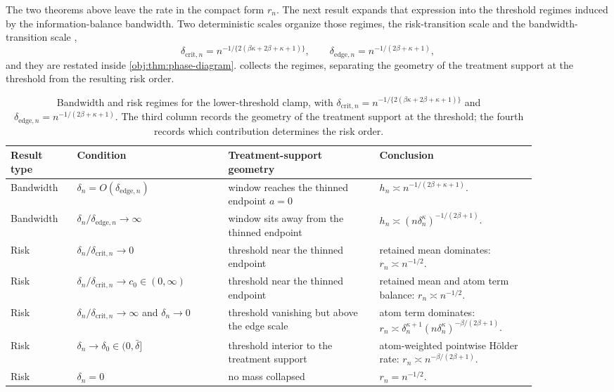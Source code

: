 The two theorems above leave the rate in the compact form \(r_n\). The next result expands that expression into the threshold regimes induced by the information-balance bandwidth. Two deterministic scales organize those regimes, the risk-transition scale  and the bandwidth-transition scale ,
\[
\delta_{\mathrm{crit},n}
=
n^{-1/\{2(\beta\kappa+2\beta+\kappa+1)\}},
\qquad
\delta_{\mathrm{edge},n}
=
n^{-1/(2\beta+\kappa+1)} ,
\]
and they are restated inside \cref{obj:thm:phase-diagram}.  collects the regimes, separating the geometry of the treatment support at the threshold from the resulting risk order.

\begin{table}[t]
\centering
\begin{tabular}{p{0.11\linewidth}p{0.25\linewidth}p{0.25\linewidth}p{0.26\linewidth}}
\hline
Result type & Condition & Treatment-support geometry & Conclusion \\
\hline
Bandwidth & \(\delta_n=O(\delta_{\mathrm{edge},n})\) & window reaches the thinned endpoint \(a=0\) & \(h_n\asymp n^{-1/(2\beta+\kappa+1)}\). \\
Bandwidth & \(\delta_n/\delta_{\mathrm{edge},n}\to\infty\) & window sits away from the thinned endpoint & \(h_n\asymp (n\delta_n^\kappa)^{-1/(2\beta+1)}\). \\
Risk & \(\delta_n/\delta_{\mathrm{crit},n}\to0\) & threshold near the thinned endpoint & retained mean dominates: \(r_n\asymp n^{-1/2}\). \\
Risk & \(\delta_n/\delta_{\mathrm{crit},n}\to c_0\in(0,\infty)\) & threshold near the thinned endpoint & retained mean and atom term balance: \(r_n\asymp n^{-1/2}\). \\
Risk & \(\delta_n/\delta_{\mathrm{crit},n}\to\infty\) and \(\delta_n\to0\) & threshold vanishing but above the edge scale & atom term dominates: \(r_n\asymp \delta_n^{\kappa+1}(n\delta_n^\kappa)^{-\beta/(2\beta+1)}\). \\
Risk & \(\delta_n\to\delta_0\in(0,\bar\delta]\) & threshold interior to the treatment support & atom-weighted pointwise Hölder rate: \(r_n\asymp n^{-\beta/(2\beta+1)}\). \\
Risk & \(\delta_n=0\) & no mass collapsed & \(r_n=n^{-1/2}\). \\
\hline
\end{tabular}
\caption{Bandwidth and risk regimes for the lower-threshold clamp, with \(\delta_{\mathrm{crit},n}=n^{-1/\{2(\beta\kappa+2\beta+\kappa+1)\}}\) and \(\delta_{\mathrm{edge},n}=n^{-1/(2\beta+\kappa+1)}\). The third column records the geometry of the treatment support at the threshold; the fourth records which contribution determines the risk order.}
\label{tab:phase-summary}
\end{table}

